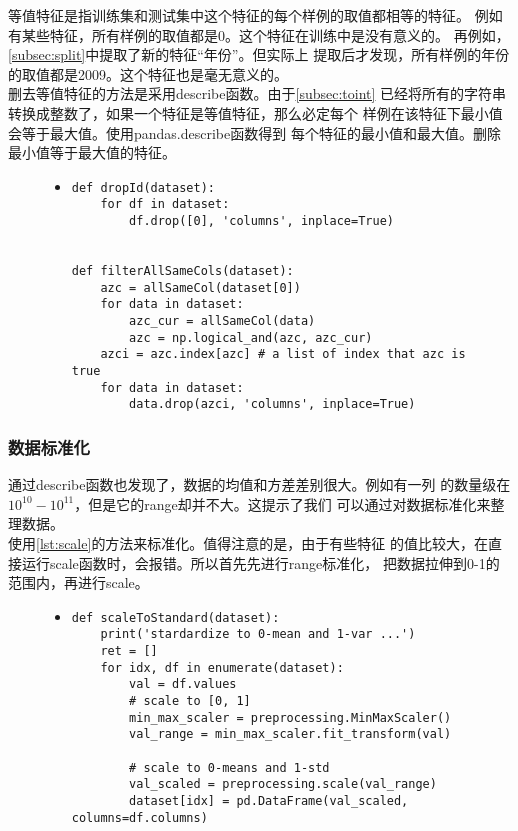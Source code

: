 \documentclass[a4paper]{article}
\begin{document}
等值特征是指训练集和测试集中这个特征的每个样例的取值都相等的特征。
例如有某些特征，所有样例的取值都是0。这个特征在训练中是没有意义的。
再例如，\autoref{subsec:split}中提取了新的特征``年份''。但实际上
提取后才发现，所有样例的年份的取值都是2009。这个特征也是毫无意义的。\\

删去等值特征的方法是采用describe函数。由于\autoref{subsec:toint}
已经将所有的字符串转换成整数了，如果一个特征是等值特征，那么必定每个
样例在该特征下最小值会等于最大值。使用pandas.describe函数得到
每个特征的最小值和最大值。删除最小值等于最大值的特征。\\

\begin{figure}[!hbt]
\begin{itemize}
\item[] \begin{lstlisting}[style=mypython, label=lst:del, caption=删去id和删去等值特征]
def dropId(dataset):
    for df in dataset:
        df.drop([0], 'columns', inplace=True)
        

def filterAllSameCols(dataset):
    azc = allSameCol(dataset[0])
    for data in dataset:
        azc_cur = allSameCol(data)
        azc = np.logical_and(azc, azc_cur)
    azci = azc.index[azc] # a list of index that azc is true
    for data in dataset:
        data.drop(azci, 'columns', inplace=True)
\end{lstlisting}
\end{itemize}
\end{figure}

\subsubsection{数据标准化}
通过describe函数也发现了，数据的均值和方差差别很大。例如有一列
的数量级在$10^10 - 10^11$，但是它的range却并不大。这提示了我们
可以通过对数据标准化来整理数据。\\

使用\autoref{lst:scale}的方法来标准化。值得注意的是，由于有些特征
的值比较大，在直接运行scale函数时，会报错。所以首先先进行range标准化，
把数据拉伸到0-1的范围内，再进行scale。

\begin{figure}[!hbt]
\begin{itemize}
\item[] \begin{lstlisting}[style=mypython, label=lst:scale, caption=数据标准化]
def scaleToStandard(dataset):
    print('stardardize to 0-mean and 1-var ...')
    ret = []
    for idx, df in enumerate(dataset):
        val = df.values
        # scale to [0, 1]
        min_max_scaler = preprocessing.MinMaxScaler()
        val_range = min_max_scaler.fit_transform(val)

        # scale to 0-means and 1-std
        val_scaled = preprocessing.scale(val_range)
        dataset[idx] = pd.DataFrame(val_scaled, columns=df.columns)
\end{lstlisting}
\end{itemize}
\end{figure}
\end{document}
